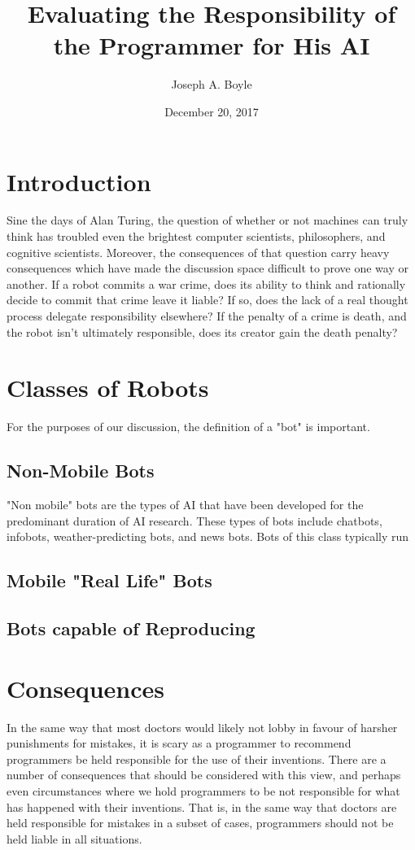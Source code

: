 \documentclass[12]{article}
\title{Evaluating the Responsibility of the Programmer for His AI}
\author{Joseph A. Boyle}
\date{December 20, 2017}
\begin{document}
\maketitle

\section{Introduction}
Sine the days of Alan Turing\cite{turing_test}, the question of whether or not machines can truly think has troubled even the brightest computer scientists, philosophers, and cognitive scientists. Moreover, the consequences of that question carry heavy consequences which have made the discussion space difficult to prove one way or another. If a robot commits a war crime, does its ability to think and rationally decide to commit that crime leave it liable? If so, does the lack of a real thought process delegate responsibility elsewhere? If the penalty of a crime is death, and the robot isn't ultimately responsible, does its creator gain the death penalty?

\section{Classes of Robots}
For the purposes of our discussion, the definition of a "bot" is important. 
	
	\subsection{Non-Mobile Bots}
		"Non mobile" bots are the types of AI that have been developed for the predominant duration of AI research. These types of bots include chatbots, infobots, weather-predicting bots, and news bots. Bots of this class typically run 
	
	\subsection{Mobile "Real Life" Bots}

	\subsection{Bots capable of Reproducing}

\section{Consequences}
	In the same way that most doctors would likely not lobby in favour of harsher punishments for mistakes, it is scary as a programmer to recommend programmers be held responsible for the use of their inventions. There are a number of consequences that should be considered with this view, and perhaps even circumstances where we hold programmers to be not responsible for what has happened with their inventions. That is, in the same way that doctors are held responsible for mistakes in a subset of cases, programmers should not be held liable in all situations.
	
\end{document}
